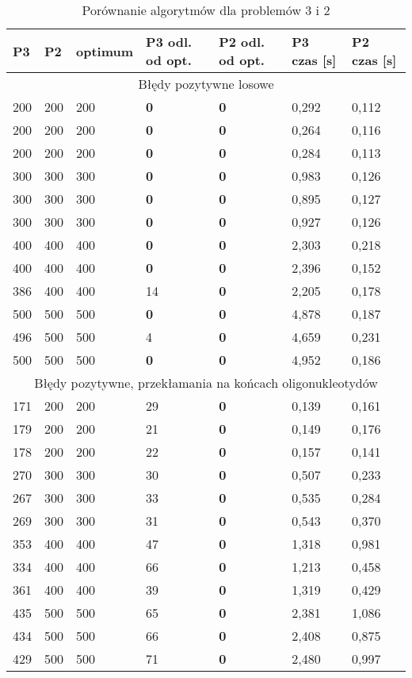 \documentclass[a4paper]{article}
\begin{document}
\begin{table}[H]
\caption{Porównanie algorytmów dla problemów 3 i 2}
\begin{tabular}{|p{1.6cm}|p{1.6cm}|p{1.6cm}|p{1.6cm}|p{1.6cm}|p{1.6cm}|p{1.6cm}|}
\hline
\multicolumn{1}{|l|}{P3} & \multicolumn{1}{l|}{P2} &
\multicolumn{1}{l|}{optimum} & \multicolumn{1}{l|}{P3 odl. od opt.} &
\multicolumn{1}{l|}{P2 odl. od opt.} &
\multicolumn{1}{l|}{P3 czas [s]} &
\multicolumn{1}{l|}{P2 czas [s]} \\ \hline
\multicolumn{7}{|c|}{Błędy pozytywne losowe} \\ \hline
200 & 200 & 200 & \textbf{0} & \textbf{0} & 0,292 & 0,112 \\ \hline
200 & 200 & 200 & \textbf{0} & \textbf{0} & 0,264 & 0,116 \\ \hline
200 & 200 & 200 & \textbf{0} & \textbf{0} & 0,284 & 0,113 \\ \hline
300 & 300 & 300 & \textbf{0} & \textbf{0} & 0,983 & 0,126 \\ \hline
300 & 300 & 300 & \textbf{0} & \textbf{0} & 0,895 & 0,127 \\ \hline
300 & 300 & 300 & \textbf{0} & \textbf{0} & 0,927 & 0,126 \\ \hline
400 & 400 & 400 & \textbf{0} & \textbf{0} & 2,303 & 0,218 \\ \hline
400 & 400 & 400 & \textbf{0} & \textbf{0} & 2,396 & 0,152 \\ \hline
386 & 400 & 400 & 14 & \textbf{0} & 2,205 & 0,178 \\ \hline
500 & 500 & 500 & \textbf{0} & \textbf{0} & 4,878 & 0,187 \\ \hline
496 & 500 & 500 & 4 & \textbf{0} & 4,659 & 0,231 \\ \hline
500 & 500 & 500 & \textbf{0} & \textbf{0} & 4,952 & 0,186 \\ \hline
\multicolumn{7}{|c|}{Błędy pozytywne, przekłamania na
końcach oligonukleotydów} \\ \hline
171 & 200 & 200 & 29 & \textbf{0} & 0,139 & 0,161 \\ \hline
179 & 200 & 200 & 21 & \textbf{0} & 0,149 & 0,176 \\ \hline
178 & 200 & 200 & 22 & \textbf{0} & 0,157 & 0,141 \\ \hline
270 & 300 & 300 & 30 & \textbf{0} & 0,507 & 0,233 \\ \hline
267 & 300 & 300 & 33 & \textbf{0} & 0,535 & 0,284 \\ \hline
269 & 300 & 300 & 31 & \textbf{0} & 0,543 & 0,370 \\ \hline
353 & 400 & 400 & 47 & \textbf{0} & 1,318 & 0,981 \\ \hline
334 & 400 & 400 & 66 & \textbf{0} & 1,213 & 0,458 \\ \hline
361 & 400 & 400 & 39 & \textbf{0} & 1,319 & 0,429 \\ \hline
435 & 500 & 500 & 65 & \textbf{0} & 2,381 & 1,086 \\ \hline
434 & 500 & 500 & 66 & \textbf{0} & 2,408 & 0,875 \\ \hline
429 & 500 & 500 & 71 & \textbf{0} & 2,480 & 0,997 \\ \hline
\end{tabular}
\label{}
\end{table}
\end{document}
